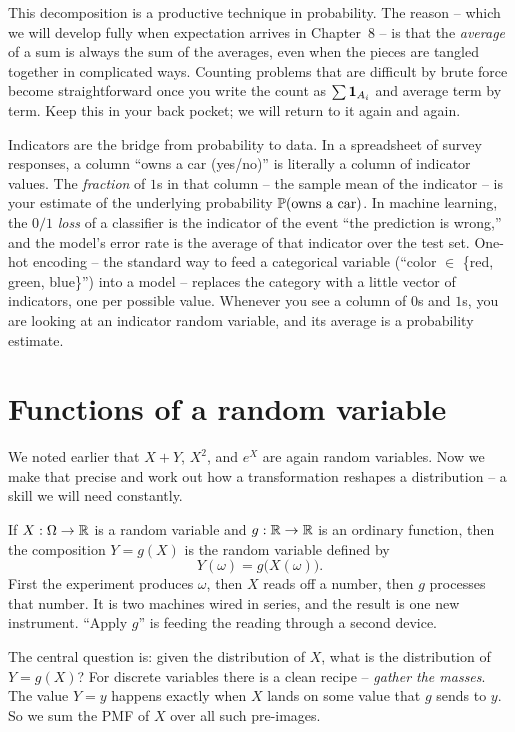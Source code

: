 This decomposition is a productive technique in probability. The reason -- which we will develop
fully when expectation arrives in Chapter~8 -- is that the \emph{average} of a
sum is always the sum of the averages, even when the pieces are tangled together in
complicated ways. Counting problems that are difficult by brute force become straightforward
once you write the count as $\sum \ind_{A_i}$ and average term by term. Keep this in
your back pocket; we will return to it again and again.

\begin{applicationbox}
Indicators are the bridge from probability to data. In a spreadsheet of survey
responses, a column ``owns a car (yes/no)'' is literally a column of indicator values.
The \emph{fraction} of $1$s in that column -- the sample mean of the indicator -- is
your estimate of the underlying probability $\P(\text{owns a car})$. In machine
learning, the $0/1$ \emph{loss} of a classifier is the indicator of the event ``the
prediction is wrong,'' and the model's error rate is the average of that indicator
over the test set. One-hot encoding -- the standard way to feed a categorical variable
(``color $\in$ \{red, green, blue\}'') into a model -- replaces the category with a
little vector of indicators, one per possible value. Whenever you see a column of $0$s
and $1$s, you are looking at an indicator random variable, and its average is a
probability estimate.
\end{applicationbox}

\section{Functions of a random variable}
\label{ch06:functions-of-rv}

We noted earlier that $X + Y$, $X^2$, and $e^X$ are again random variables. Now we make
that precise and work out how a transformation reshapes a distribution -- a skill
we will need constantly.

If $X : \Omega \to \R$ is a random variable and $g : \R \to \R$ is an ordinary
function, then the composition $Y = g(X)$ is the random variable defined by
\[
  Y(\omega) = g\big(X(\omega)\big).
\]
First the experiment produces $\omega$, then $X$ reads off a number, then $g$ processes
that number. It is two machines wired in series, and the result is one new instrument.
``Apply $g$'' is feeding the reading through a second device.

The central question is: given the distribution of $X$, what is the distribution of
$Y = g(X)$? For discrete variables there is a clean recipe -- \emph{gather the masses}.
The value $Y = y$ happens exactly when $X$ lands on some value that $g$ sends to $y$.
So we sum the PMF of $X$ over all such pre-images.

